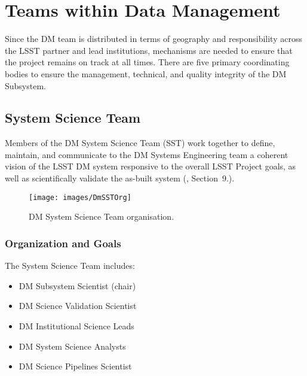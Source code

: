 \section{Teams within Data Management} \label{sect:groups}

Since the DM team is distributed in terms of geography and responsibility across the LSST partner and lead institutions, mechanisms are needed to ensure that the project remains on track at all times. There are five primary coordinating bodies to ensure the management, technical, and quality integrity of the DM Subsystem.

\subsection{System Science Team \label{sect:dmsst}}

Members of the DM System Science Team (SST) work together to define, maintain, and communicate to the DM Systems Engineering team a coherent vision of the LSST DM system responsive to the overall LSST Project goals, as well as scientifically validate the as-built system (, Section~9.).

\begin{figure}[htbp]
\begin{center}
\texttt{[image: images/DmSSTOrg]}
\caption{DM System Science Team organisation.
\label{fig:sstorg}}
\end{center}
\end{figure}



\subsubsection{Organization and Goals}
\label{sect:dm-sst-org}

The System Science Team includes:
\begin{itemize}
\item DM Subsystem Scientist (chair)
\item DM Science Validation Scientist
\item DM Institutional Science Leads
\item DM System Science Analysts
\item DM Science Pipelines Scientist
\end{itemize}

